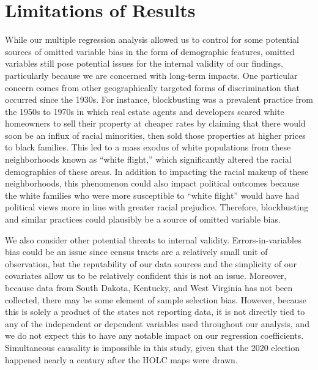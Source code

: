 \documentclass{eco_375_paper}
\begin{document}
\section*{Limitations of Results}
While our multiple regression analysis allowed us to control for some potential sources of omitted variable bias in the form of demographic features, omitted variables still pose potential issues for the internal validity of our findings, particularly because we are concerned with long-term impacts. One particular concern comes from other geographically targeted forms of discrimination that occurred since the 1930s. For instance, blockbusting was a prevalent practice from the 1950s to 1970s in which real estate agents and developers scared white homeowners to sell their property at cheaper rates by claiming that there would soon be an influx of racial minorities, then sold those properties at higher prices to black families. This led to a mass exodus of white populations from these neighborhoods known as “white flight,” which significantly altered the racial demographics of these areas. In addition to impacting the racial makeup of these neighborhoods, this phenomenon could also impact political outcomes because the white families who were more susceptible to “white flight” would have had political views more in line with greater racial prejudice. Therefore, blockbusting and similar practices could plausibly be a source of omitted variable bias.

We also consider other potential threats to internal validity. Errors-in-variables bias could be an issue since census tracts are a relatively small unit of observation, but the reputability of our data sources and the simplicity of our covariates allow us to be relatively confident this is not an issue. Moreover, because data from South Dakota, Kentucky, and West Virginia has not been collected, there may be some element of sample selection bias. However, because this is solely a product of the states not reporting data, it is not directly tied to any of the independent or dependent variables used throughout our analysis, and we do not expect this to have any notable impact on our regression coefficients. Simultaneous causality is impossible in this study, given that the 2020 election happened nearly a century after the HOLC maps were drawn.
\end{document}
